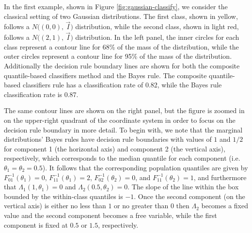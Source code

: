 In the first example, shown in Figure \ref{fig:gaussian-classify}, we consider
the classical setting of two Gaussian distributions.  The first class, shown in
yellow, follows a $N \big( (0, 0),\, \vec{I} \big)$ distribution, while the
second class, shown in light red, follows a $N \big( (2, 1),\, \vec{I} \big)$
distribution.  In the left panel, the inner circles for each class represent a
contour line for 68\% of the mass of the distribution, while the outer circles
represent a contour line for 95\% of the mass of the distribution.  Additionally
the decision rule boundary lines are shown for both the composite quantile-based
classifiers method and the Bayes rule.  The composite quantile-based classifiers
rule has a classification rate of 0.82, while the Bayes rule classification rate
is 0.87.

The same contour lines are shown on the right panel, but the figure is zoomed in
on the upper-right quadrant of the coordinate system in order to focus on the
decision rule boundary in more detail.  To begin with, we note that the marginal
distributions' Bayes rules have decision rule boundaries with values of $1$ and
$1/2$ for component 1 (the horizontal axis) and component 2 (the vertical axis),
respectively, which corresponds to the median quantile for each component (i.e.
$\theta_1 = \theta_2 = 0.5$).  It follows that the corresponding population
quantiles are given by $F_{01}^{-1}(\theta_1) = 0$, $F_{11}^{-1}(\theta_1) = 2$,
$F_{02}^{-1}(\theta_2) = 0$, and $F_{11}^{-1}(\theta_2) = 1$, and furthermore
that $\Lambda_1(1, \theta_1) = 0$ and $\Lambda_2(0.5, \theta_2) = 0$.  The slope
of the line within the box bounded by the within-class quantiles is $-1$.  Once
the second component (on the vertical axis) is either no less than $1$ or no
greater than $0$ then $\Lambda_2$ becomes a fixed value and the second component
becomes a free variable, while the first component is fixed at $0.5$ or $1.5$,
respectively.




